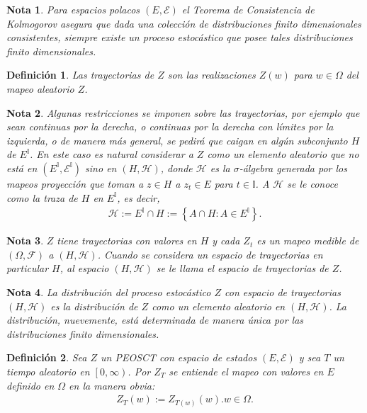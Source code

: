 \documentclass{article}
\newtheorem{Def}{Definición}
\newtheorem{Note}{Nota}
\begin{document}
\begin{Note}
Para espacios polacos $\left(E,\mathcal{E}\right)$ el Teorema de Consistencia de Kolmogorov asegura que dada una colecci\'on de distribuciones finito dimensionales consistentes, siempre existe un proceso estoc\'astico que posee tales distribuciones finito dimensionales.
\end{Note}


\begin{Def}
Las trayectorias de $Z$ son las realizaciones $Z\left(w\right)$ para $w\in\Omega$ del mapeo aleatorio $Z$.
\end{Def}

\begin{Note}
Algunas restricciones se imponen sobre las trayectorias, por ejemplo que sean continuas por la derecha, o continuas por la derecha con l\'imites por la izquierda, o de manera m\'as general, se pedir\'a que caigan en alg\'un subconjunto $H$ de $E^{\mathbb{I}}$. En este caso es natural considerar a $Z$ como un elemento aleatorio que no est\'a en $\left(E^{\mathbb{I}},\mathcal{E}^{\mathbb{I}}\right)$ sino en $\left(H,\mathcal{H}\right)$, donde $\mathcal{H}$ es la $\sigma$-\'algebra generada por los mapeos proyecci\'on que toman a $z\in H$ a $z_{t}\in E$ para $t\in\mathbb{I}$. A $\mathcal{H}$ se le conoce como la traza de $H$ en $E^{\mathbb{I}}$, es decir,
\begin{eqnarray}
\mathcal{H}:=E^{\mathbb{I}}\cap H:=\left\{A\cap H:A\in E^{\mathbb{I}}\right\}.
\end{eqnarray}
\end{Note}


\begin{Note}
$Z$ tiene trayectorias con valores en $H$ y cada $Z_{t}$ es un mapeo medible de $\left(\Omega,\mathcal{F}\right)$ a $\left(H,\mathcal{H}\right)$. Cuando se considera un espacio de trayectorias en particular $H$, al espacio $\left(H,\mathcal{H}\right)$ se le llama el espacio de trayectorias de $Z$.
\end{Note}

\begin{Note}
La distribuci\'on del proceso estoc\'astico $Z$ con espacio de trayectorias $\left(H,\mathcal{H}\right)$ es la distribuci\'on de $Z$ como  un elemento aleatorio en $\left(H,\mathcal{H}\right)$. La distribuci\'on, nuevemente, est\'a determinada de manera \'unica por las distribuciones finito dimensionales.
\end{Note}


\begin{Def}
Sea $Z$ un PEOSCT  con espacio de estados $\left(E,\mathcal{E}\right)$ y sea $T$ un tiempo aleatorio en $\left[0,\infty\right)$. Por $Z_{T}$ se entiende el mapeo con valores en $E$ definido en $\Omega$ en la manera obvia:
\begin{eqnarray*}
Z_{T}\left(w\right):=Z_{T\left(w\right)}\left(w\right). w\in\Omega.
\end{eqnarray*}
\end{Def}
\end{document}
